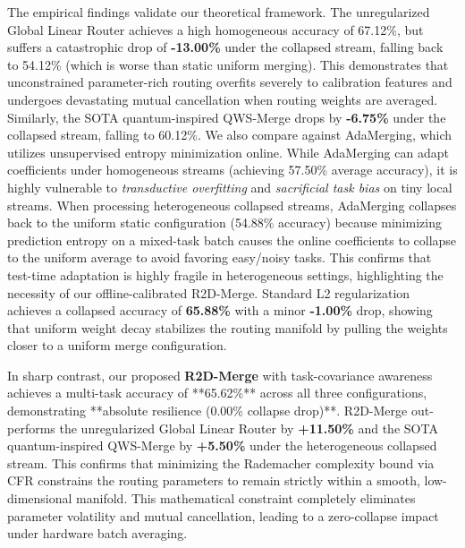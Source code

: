 The empirical findings validate our theoretical framework. 
The unregularized Global Linear Router achieves a high homogeneous accuracy of 67.12\%, but suffers a catastrophic drop of \textbf{-13.00\%} under the collapsed stream, falling back to 54.12\% (which is worse than static uniform merging). This demonstrates that unconstrained parameter-rich routing overfits severely to calibration features and undergoes devastating mutual cancellation when routing weights are averaged.
Similarly, the SOTA quantum-inspired QWS-Merge drops by \textbf{-6.75\%} under the collapsed stream, falling to 60.12\%. 
We also compare against AdaMerging, which utilizes unsupervised entropy minimization online. While AdaMerging can adapt coefficients under homogeneous streams (achieving 57.50\% average accuracy), it is highly vulnerable to \emph{transductive overfitting} and \emph{sacrificial task bias} on tiny local streams. When processing heterogeneous collapsed streams, AdaMerging collapses back to the uniform static configuration (54.88\% accuracy) because minimizing prediction entropy on a mixed-task batch causes the online coefficients to collapse to the uniform average to avoid favoring easy/noisy tasks. This confirms that test-time adaptation is highly fragile in heterogeneous settings, highlighting the necessity of our offline-calibrated R2D-Merge.
Standard L2 regularization achieves a collapsed accuracy of \textbf{65.88\%} with a minor \textbf{-1.00\%} drop, showing that uniform weight decay stabilizes the routing manifold by pulling the weights closer to a uniform merge configuration.

In sharp contrast, our proposed \textbf{R2D-Merge} with task-covariance awareness achieves a multi-task accuracy of **65.62\%** across all three configurations, demonstrating **absolute resilience (0.00\% collapse drop)**. R2D-Merge out-performs the unregularized Global Linear Router by \textbf{+11.50\%} and the SOTA quantum-inspired QWS-Merge by \textbf{+5.50\%} under the heterogeneous collapsed stream. This confirms that minimizing the Rademacher complexity bound via CFR constrains the routing parameters to remain strictly within a smooth, low-dimensional manifold. This mathematical constraint completely eliminates parameter volatility and mutual cancellation, leading to a zero-collapse impact under hardware batch averaging.

